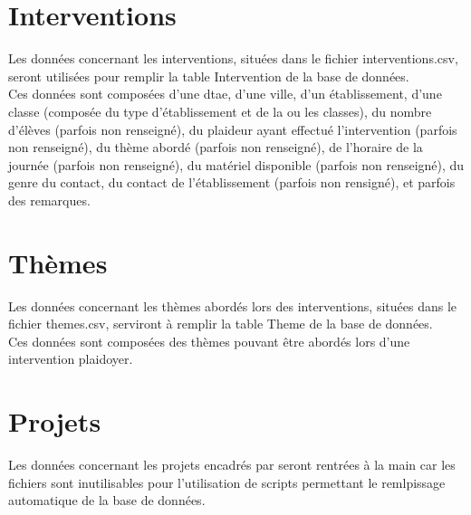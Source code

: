 \section{Interventions}
	Les données concernant les interventions, situées dans le fichier interventions.csv, seront utilisées pour remplir la table Intervention de la base de données. \\
	
	Ces données sont composées d'une dtae, d'une ville, d'un établissement, d'une classe (composée du type d'établissement et de la ou les classes), du nombre d'élèves (parfois non renseigné), du plaideur ayant effectué l'intervention (parfois non renseigné), du thème abordé (parfois non renseigné), de l'horaire de la journée (parfois non renseigné), du matériel disponible (parfois non renseigné), du genre du contact, du contact de l'établissement (parfois non rensigné), et parfois des remarques.
	
\section{Thèmes}
	Les données concernant les thèmes abordés lors des interventions, situées dans le fichier themes.csv, serviront à remplir la table Theme de la base de données. \\
	
	Ces données sont composées des thèmes pouvant être abordés lors d'une intervention plaidoyer.
	
\section{Projets}
	Les données concernant les projets encadrés par \nomClient seront rentrées à la main car les fichiers sont inutilisables pour l'utilisation de scripts permettant le remlpissage automatique de la base de données. \\
	